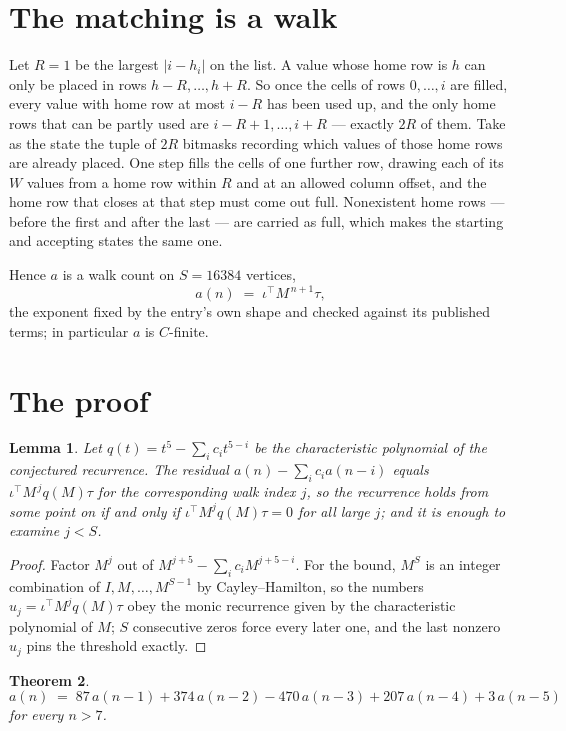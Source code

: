 \documentclass[11pt,a4paper]{article}
\theoremstyle{plain}
\newtheorem{theorem}{Theorem}
\newtheorem{lemma}[theorem]{Lemma}
\theoremstyle{definition}
\begin{document}
\section{The matching is a walk}

Let $R=1$ be the largest $|i-h_i|$ on the list. A value whose home row is $h$ can only be
placed in rows $h-R,\dots,h+R$. So once the cells of rows $0,\dots,i$ are filled, every
value with home row at most $i-R$ has been used up, and the only home rows that can be
partly used are $i-R+1,\dots,i+R$ --- exactly $2R$ of them. Take as the state the tuple of
$2R$ bitmasks recording which values of those home rows are already placed. One step fills
the cells of one further row, drawing each of its $W$ values from a home row within $R$
and at an allowed column offset, and the home row that closes at that step must come out
full. Nonexistent home rows --- before the first and after the last --- are carried as
full, which makes the starting and accepting states the same one.

Hence $a$ is a walk count on $S=16384$ vertices,
\[
a(n)\;=\;\iota^{\!\top}M^{\,n+1}\tau ,
\]
the exponent fixed by the entry's own shape and checked against its published terms; in
particular $a$ is $C$-finite.

\section{The proof}

\begin{lemma}\label{lem:crit}
Let $q(t)=t^{5}-\sum_i c_it^{5-i}$ be the characteristic polynomial of the
conjectured recurrence. The residual $a(n)-\sum_ic_ia(n-i)$ equals
$\iota^{\!\top}M^{\,j}q(M)\tau$ for the corresponding walk index $j$, so the recurrence
holds from some point on if and only if $\iota^{\!\top}M^{j}q(M)\tau=0$ for all large $j$;
and it is enough to examine $j<S$.
\end{lemma}

\begin{proof}
Factor $M^{j}$ out of $M^{j+5}-\sum_ic_iM^{j+5-i}$. For the bound, $M^{S}$
is an integer combination of $I,M,\dots,M^{S-1}$ by Cayley--Hamilton, so the numbers
$u_j=\iota^{\!\top}M^{j}q(M)\tau$ obey the monic recurrence given by the characteristic
polynomial of $M$; $S$ consecutive zeros force every later one, and the last nonzero $u_j$
pins the threshold exactly.
\end{proof}

\begin{theorem}
\[
a(n)\;=\;87\,a(n-1) + 374\,a(n-2) - 470\,a(n-3) + 207\,a(n-4) + 3\,a(n-5)
\]
for every $n>7$.
\end{theorem}
\end{document}
